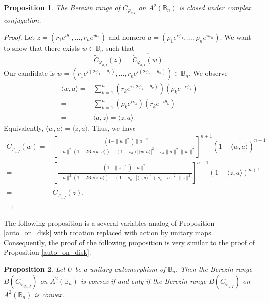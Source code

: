\documentclass{amsart}
\newtheorem{proposition}{Proposition}
\theoremstyle{remark}
\newcommand{\B}{\mathbb{B}}
\begin{document}
\begin{proposition}\label{propconj1}
The Berezin range of $C_{\varphi_{a,I}}$ on $A^2(\B_n)$ is closed under complex conjugation.
\end{proposition}
\begin{proof}
Let $z=(r_1e^{i\theta_1},\dots,r_ne^{i\theta_n})$ and nonzero $a=(\rho_1e^{i\psi_1},\dots,\rho_ne^{i\psi_n})$. We want to show that there exists $w \in \B_n$ such that 
\[\widetilde{C}_{\varphi_{a,I}}(z)= \overline{\widetilde{C}_{\varphi_{a,I}}(w)}.\]
Our candidate is $w=(r_1e^{i(2\psi_1-\theta_1)},\dots,r_ne^{i(2\psi_n-\theta_n)}) \in \B_n$. We observe
\begin{align*}
\langle w,a \rangle =& \sum_{k=1}^n\left(r_ke^{i(2\psi_k-\theta_k)}\right)\left(\rho_ke^{-i\psi_k} \right) \\
=& \sum_{k=1}^n \left(\rho_ke^{i\psi_k} \right)\left(r_ke^{-i\theta_k} \right) \\
=& \langle a,z \rangle = \overline{\langle z,a \rangle}.
\end{align*}
Equivalently, $\overline{\langle w,a \rangle}=\langle z,a \rangle$. Thus, we have
\begin{align*}
\overline{\widetilde{C}_{\varphi_{a,I}}(w)} =& \left[\frac{(1 - \|w\|^{2})\|a\|^{2}}{\|a\|^{2}(1-2\mathrm{Re}\langle w,a \rangle) + (1-s_{a})|\langle w,a \rangle|^2 + s_{a}\|a\|^2\|w\|^2}\right]^{n+1}(1 - \overline{\langle w,a \rangle})^{n+1} \\
=& \left[\frac{(1 - \|z\|^{2})\|a\|^{2}}{\|a\|^{2}(1-2\mathrm{Re}\langle z,a \rangle) + (1-s_{a})|\langle z,a \rangle|^2 + s_{a}\|a\|^2\|z\|^2}\right]^{n+1}(1 - \langle z,a \rangle)^{n+1} \\
=& \widetilde{C}_{\varphi_{a,I}}(z).
\end{align*}
\end{proof}
The following proposition is a several variables analog of Proposition \ref{auto_on_disk} with rotation replaced with action by unitary maps.  Consequently, the proof of the following proposition is very similar to the proof of Proposition \ref{auto_on_disk}.
\begin{proposition}\label{propunitary}
    Let $U$ be a unitary automorphism of $\mathbb{B}_n$.  Then the Berezin range
    $B(C_{\varphi_{Ua,I}})$ on $A^2(\mathbb{B}_n)$ is convex if and only if the Berezin range $B(C_{\varphi_{a,I}})$ on $A^2(\mathbb{B}_n)$ is convex.
\end{proposition}
\end{document}

